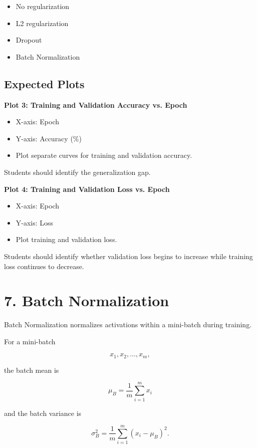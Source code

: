 \documentclass[10pt]{article}
\begin{document}
\begin{itemize}
\item No regularization
\item L2 regularization
\item Dropout
\item Batch Normalization
\end{itemize}

\subsection*{Expected Plots}

\textbf{Plot 3: Training and Validation Accuracy vs. Epoch}

\begin{itemize}
\item X-axis: Epoch
\item Y-axis: Accuracy (\%)
\item Plot separate curves for training and validation accuracy.
\end{itemize}

Students should identify the generalization gap.

\textbf{Plot 4: Training and Validation Loss vs. Epoch}

\begin{itemize}
\item X-axis: Epoch
\item Y-axis: Loss
\item Plot training and validation loss.
\end{itemize}

Students should identify whether validation loss begins to increase while
training loss continues to decrease.

\section*{7. Batch Normalization}

Batch Normalization normalizes activations within a mini-batch during
training.

For a mini-batch

\[
x_1,x_2,\ldots,x_m,
\]

the batch mean is

\[
\mu_B=\frac{1}{m}\sum_{i=1}^{m}x_i
\]

and the batch variance is

\[
\sigma_B^2=
\frac{1}{m}\sum_{i=1}^{m}(x_i-\mu_B)^2.
\]
\end{document}
